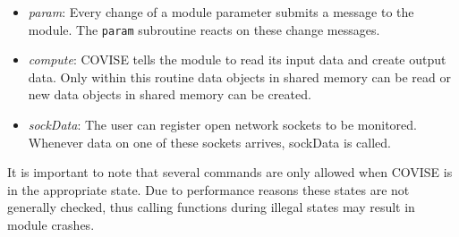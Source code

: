 \begin{itemize}

\item {\it param}: Every change of a module parameter submits a message 
to the module. The \texttt{param} subroutine reacts on these change messages.

\item {\it compute}: COVISE tells the module to read its input data and create output data. 
Only within this routine data objects in shared memory can be read or new data objects 
in shared memory can be created.

\item {\it sockData}: The user can register open network sockets to be monitored. Whenever 
data on one of these sockets arrives, sockData is called.

\end{itemize}

It is important to note that several commands are only allowed when COVISE is in the 
appropriate state. Due to performance reasons these states are not generally checked, 
thus calling functions during illegal states may result in module crashes.

